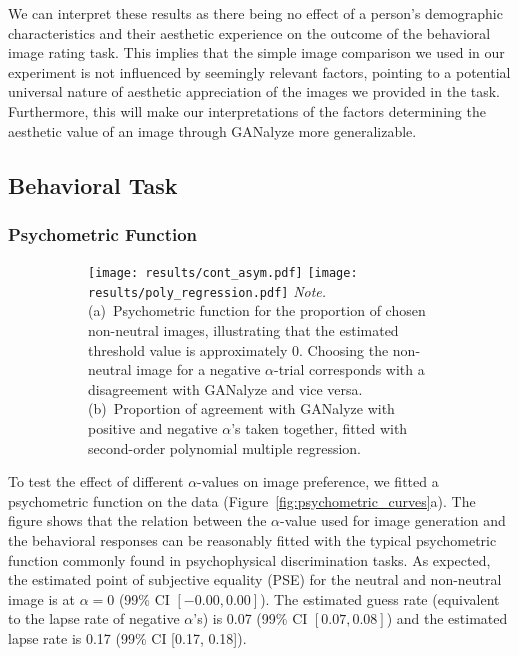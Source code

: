 \documentclass[../main.tex]{subfiles}
\begin{document}
	We can interpret these results as there being no effect of a person's demographic characteristics and their aesthetic experience on the outcome of the behavioral image rating task. This implies that the simple image comparison we used in our experiment is not influenced by seemingly relevant factors, pointing to a potential universal nature of aesthetic appreciation of the images we provided in the task. Furthermore, this will make our interpretations of the factors determining the aesthetic value of an image through GANalyze more generalizable.
	


	\subsection{Behavioral Task}
	\subsubsection{Psychometric Function}
	
	
	\begin{figure}[h!]
		\caption{Behavioral Results from the Image Rating Task}
		\label{fig:psychometric_curves}
		\centering
		\begin{subfigure}{\textwidth}
			{\centering
				\texttt{[image: results/cont\_asym.pdf]}
				\hfill
				\texttt{[image: results/poly\_regression.pdf]}}
			{\normalfont \textit{Note.} (a)~Psychometric function for the proportion of chosen non-neutral images, illustrating that the estimated threshold value is approximately 0. Choosing the non-neutral image for a negative $\alpha$-trial corresponds with a disagreement with GANalyze and vice versa. (b)~Proportion of agreement with GANalyze with positive and negative $\alpha$'s taken together, fitted with second-order polynomial multiple regression.}
		\end{subfigure}
	\end{figure}
	
	To test the effect of different $\alpha$-values on image preference, we fitted a psychometric function on the data (Figure~\ref{fig:psychometric_curves}a). The figure shows that the relation between the $\alpha$-value used for image generation and the behavioral responses can be reasonably fitted with the typical psychometric function commonly found in psychophysical discrimination tasks. As expected, the estimated point of subjective equality (PSE) for the neutral and non-neutral image is at $\alpha = 0$ (99\% CI $[-0.00, 0.00]$). The estimated guess rate (equivalent to the lapse rate of negative $\alpha$'s) is 0.07 (99\% CI $[0.07, 0.08]$) and the estimated lapse rate is 0.17 (99\% CI [0.17, 0.18]).
	
\end{document}
